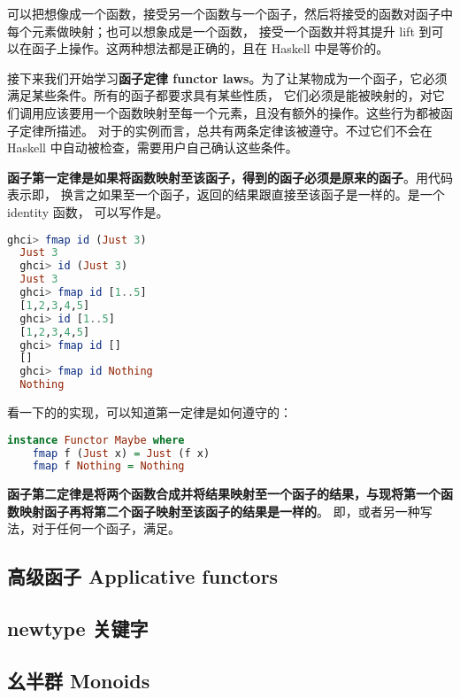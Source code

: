 \documentclass[./main.tex]{subfiles}
\begin{document}
可以把想像成一个函数，接受另一个函数与一个函子，然后将接受的函数对函子中每个元素做映射；也可以想象成是一个函数，
接受一个函数并将其提升 lift 到可以在函子上操作。这两种想法都是正确的，且在 Haskell 中是等价的。

接下来我们开始学习\textbf{函子定律 functor laws}。为了让某物成为一个函子，它必须满足某些条件。所有的函子都要求具有某些性质，
它们必须是能被映射的，对它们调用应该要用一个函数映射至每一个元素，且没有额外的操作。这些行为都被函子定律所描述。
对于的实例而言，总共有两条定律该被遵守。不过它们不会在 Haskell 中自动被检查，需要用户自己确认这些条件。

\textbf{函子第一定律是如果将函数映射至该函子，得到的函子必须是原来的函子}。用代码表示即，
换言之如果至一个函子，返回的结果跟直接至该函子是一样的。是一个 identity 函数，
可以写作是。

\begin{lstlisting}[language=Haskell]
  ghci> fmap id (Just 3)
  Just 3
  ghci> id (Just 3)
  Just 3
  ghci> fmap id [1..5]
  [1,2,3,4,5]
  ghci> id [1..5]
  [1,2,3,4,5]
  ghci> fmap id []
  []
  ghci> fmap id Nothing
  Nothing
\end{lstlisting}

看一下的的实现，可以知道第一定律是如何遵守的：

\begin{lstlisting}[language=Haskell]
  instance Functor Maybe where
    fmap f (Just x) = Just (f x)
    fmap f Nothing = Nothing
\end{lstlisting}

\textbf{函子第二定律是将两个函数合成并将结果映射至一个函子的结果，与现将第一个函数映射函子再将第二个函子映射至该函子的结果是一样的}。
即，或者另一种写法，对于任何一个函子，满足。

\subsection*{高级函子 Applicative functors}


\subsection*{newtype 关键字}


\subsection*{幺半群 Monoids}

\end{document}
